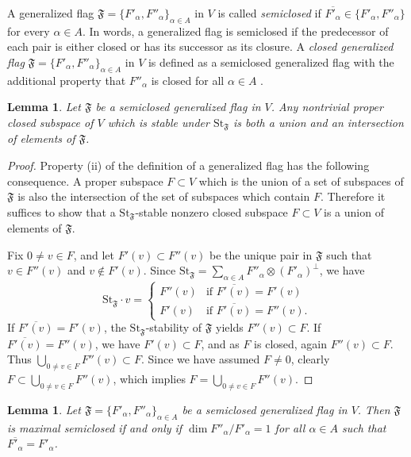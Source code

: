 \documentclass{article}
\newcommand {\St} {\mathrm{St}}
\def\F{\mathfrak{F}}
\newtheorem{lemma}[thm]{Lemma}
\begin{document}
A generalized flag $\F = \{ F'_\alpha , F''_\alpha \}_{\alpha \in A}$ in $V$ is called \emph{semiclosed} if $\overline{F'_\alpha} \in \{ F'_\alpha , F''_\alpha \}$ for every $\alpha \in A$.  In words, a generalized flag is semiclosed if the predecessor of each pair is either closed or has its successor as its closure.  A \emph{closed generalized flag} $\F = \{ F'_\alpha , F''_\alpha \}_{\alpha \in A}$ in $V$ is defined as a semiclosed generalized flag with the additional property that $F''_\alpha$ is closed for all $\alpha \in A$ \cite{DP2}.


\begin{lemma} \label{stablesubspaces}
Let $\F$ be a semiclosed generalized flag in $V$.  Any nontrivial proper closed subspace of $V$ which is stable under $\St_\F$ is both a union and an intersection of elements of $\F$.
\end{lemma}

\begin{proof}
Property (ii) of the definition of a generalized flag has the following consequence.  A proper subspace $F \subset V$ which is the union of a set of subspaces of $\F$ is also the intersection of the set of subspaces which contain $F$.  Therefore it suffices to show that a $\St_\F$-stable nonzero closed subspace $F \subset V$ is a union of elements of $\F$.

Fix $0 \neq v \in F$, and let $F'(v) \subset F''(v)$ be the unique pair in $\F$ such that $v \in F''(v)$ and $v \notin F'(v)$.  Since $\St_\F = \sum_{\alpha \in A} F''_\alpha \otimes (F'_\alpha)^\perp$, we have  
$$\St_\F \cdot v = 
\begin{cases}
F''(v) & \textrm{if } \overline{F'(v)} = F'(v) \\
F'(v) & \textrm{if }\overline{F'(v)} = F''(v).
\end{cases}$$
If $\overline{F'(v)} = F'(v)$, the $\St_\F$-stability of $\F$ yields $F''(v) \subset F$.  If $\overline{F'(v)} = F''(v)$, we have $F'(v) \subset F$, and as $F$ is closed, again $F''(v) \subset F$.  Thus $\bigcup_{0 \neq v \in F} F''(v) \subset F$.  Since we have assumed $F \neq 0$, clearly $F \subset \bigcup_{0 \neq v \in F} F''(v)$, which implies $F = \bigcup_{0 \neq v \in F} F''(v)$.
\end{proof}


\begin{lemma} \label{maximalsemiclosed}
Let $\F = \{ F'_\alpha , F''_\alpha \}_{\alpha \in A}$ be a semiclosed generalized flag in $V$.  Then $\F$ is maximal semiclosed if and only if $\dim F''_\alpha / F'_\alpha = 1$ for all $\alpha \in A$ such that $\overline{F'_\alpha} = F'_\alpha$.
\end{lemma}
\end{document}
